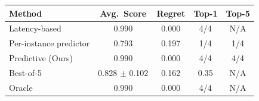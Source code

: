 \begin{tabular}{lcccc}
\toprule
Method & Avg.\ Score & Regret & Top-1 & Top-5 \\
\midrule
Latency-based & 0.990 & 0.000 & 4/4 & N/A \\
Per-instance predictor & 0.793 & 0.197 & 1/4 & 1/4 \\
Predictive (Ours) & 0.990 & 0.000 & 4/4 & 4/4 \\
Best-of-5 & 0.828 $\pm$ 0.102 & 0.162 & 0.35 & N/A \\
Oracle & 0.990 & 0.000 & 4/4 & N/A \\
\bottomrule
\end{tabular}
